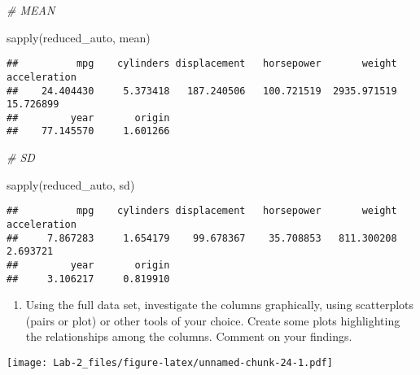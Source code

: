 \documentclass[
]{article}
\newenvironment{Shaded}{\begin{snugshade}}{\end{snugshade}}
\newcommand{\AttributeTok}[1]{\textcolor[rgb]{0.77,0.63,0.00}{#1}}
\newcommand{\CommentTok}[1]{\textcolor[rgb]{0.56,0.35,0.01}{\textit{#1}}}
\newcommand{\FunctionTok}[1]{\textcolor[rgb]{0.00,0.00,0.00}{#1}}
\newcommand{\NormalTok}[1]{#1}
\newcommand{\SpecialCharTok}[1]{\textcolor[rgb]{0.00,0.00,0.00}{#1}}
\providecommand{\tightlist}{%
  \setlength{\itemsep}{0pt}\setlength{\parskip}{0pt}}
\begin{document}
\begin{Shaded}
\begin{Highlighting}[]
\CommentTok{\# MEAN}

\FunctionTok{sapply}\NormalTok{(reduced\_auto, mean)}
\end{Highlighting}
\end{Shaded}

\begin{verbatim}
##          mpg    cylinders displacement   horsepower       weight acceleration 
##    24.404430     5.373418   187.240506   100.721519  2935.971519    15.726899 
##         year       origin 
##    77.145570     1.601266
\end{verbatim}

\begin{Shaded}
\begin{Highlighting}[]
\CommentTok{\# SD}

\FunctionTok{sapply}\NormalTok{(reduced\_auto, sd)}
\end{Highlighting}
\end{Shaded}

\begin{verbatim}
##          mpg    cylinders displacement   horsepower       weight acceleration 
##     7.867283     1.654179    99.678367    35.708853   811.300208     2.693721 
##         year       origin 
##     3.106217     0.819910
\end{verbatim}

\begin{enumerate}
\def\labelenumi{\alph{enumi}.}
\setcounter{enumi}{3}
\tightlist
\item
  Using the full data set, investigate the columns graphically, using
  scatterplots (pairs or plot) or other tools of your choice. Create
  some plots highlighting the relationships among the columns. Comment
  on your findings.
\end{enumerate}

\begin{Shaded}
\end{Shaded}

\texttt{[image: Lab-2\_files/figure-latex/unnamed-chunk-24-1.pdf]}

\begin{Shaded}
\end{Shaded}
\end{document}
